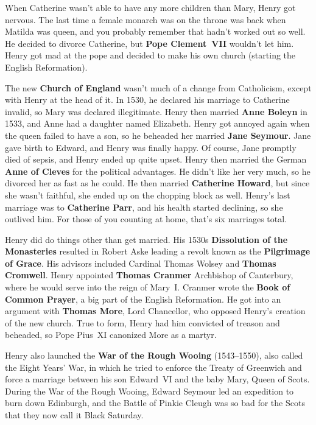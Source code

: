 When Catherine wasn't able to have any more children than Mary, Henry got nervous.
The last time a female monarch was on the throne was back when Matilda was queen,
and you probably remember that hadn't worked out so well.
He decided to divorce Catherine, but \textbf{Pope Clement~VII} wouldn't let him.
Henry got mad at the pope and decided to make his own church (starting the English Reformation).

The new \textbf{Church of England} wasn't much of a change from Catholicism,
except with Henry at the head of it.
In 1530, he declared his marriage to Catherine invalid, so Mary was declared illegitimate.
Henry then married \textbf{Anne Boleyn} in 1533, and Anne had a daughter named Elizabeth.
Henry got annoyed again when the queen failed to have a son,
so he beheaded her married \textbf{Jane Seymour}.
Jane gave birth to Edward, and Henry was finally happy.
Of course, Jane promptly died of sepsis, and Henry ended up quite upset.
Henry then married the German \textbf{Anne of Cleves} for the political advantages.
He didn't like her very much, so he divorced her as fast as he could.
He then married \textbf{Catherine Howard}, but since she wasn't faithful,
she ended up on the chopping block as well.
Henry's last marriage was to \textbf{Catherine Parr},
and his health started declining, so she outlived him.
For those of you counting at home, that's six marriages total.

Henry did do things other than get married.
His 1530s \textbf{Dissolution of the Monasteries} resulted in
Robert Aske leading a revolt known as the \textbf{Pilgrimage of Grace}.
His advisors included Cardinal Thomas Wolsey and \textbf{Thomas Cromwell}.
Henry appointed \textbf{Thomas Cranmer} Archbishop of Canterbury,
where he would serve into the reign of Mary~I.
Cranmer wrote the \textbf{Book of Common Prayer}, a big part of the English Reformation.
He got into an argument with \textbf{Thomas More}, Lord Chancellor,
who opposed Henry's creation of the new church.
True to form, Henry had him convicted of treason and beheaded,
so Pope Pius~XI canonized More as a martyr.

Henry also launched the \textbf{War of the Rough Wooing} (1543--1550),
also called the Eight Years' War,
in which he tried to enforce the Treaty of Greenwich
and force a marriage between his son Edward~VI and the baby Mary, Queen of Scots.
During the War of the Rough Wooing, Edward Seymour led an expedition to burn down Edinburgh,
and the Battle of Pinkie Cleugh was so bad for the Scots that they now call it Black Saturday.

